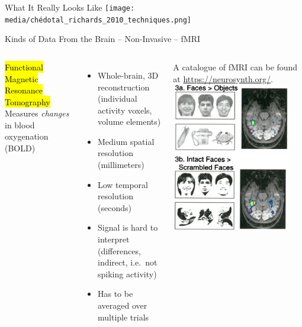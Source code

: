 \documentclass[handout,aspectratio=169]{beamer}
\begin{document}
\begin{frame}{What It Really Looks Like}
	\centering
	\vspace{0.25cm}
	\texttt{[image: media/chédotal\_richards\_2010\_techniques.png]}
	\vspace{0.125cm}
\end{frame}


\begin{frame}{Kinds of Data From the Brain -- Non-Invasive -- fMRI}
	\vspace{0.25cm}
	\begin{columns}
		\hl{Functional Magnetic Resonance Tomography}\\[0.125cm] Measures \emph{changes} in blood oxygenation (BOLD)
		\begin{itemize}
			\setlength\itemsep{0.25cm}
			\item[\OPlus] Whole-brain, 3D reconstruction\\(individual activity voxels, volume elements)
			\item[\OMeh] Medium spatial resolution (millimeters)
			\item[\OMinus] Low temporal resolution (seconds)
			\item[\OMinus] Signal is hard to interpret\\(differences, indirect, i.e.~not spiking activity)
			\item[\OMinus] Has to be averaged over multiple trials
		\end{itemize}
		\vspace{0.25cm}
		A catalogue of fMRI can be found at \url{https://neurosynth.org/}.
		\includegraphics[height=6.5cm]{media/kanwisher_et_al_1997_fusiform_fmri.png}%
	\end{columns}
	\vspace{0.25cm}
\end{frame}
\end{document}
